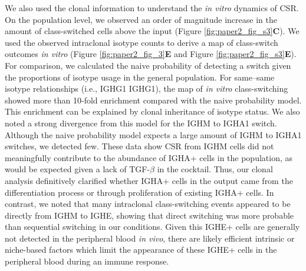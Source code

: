 We also used the clonal information to understand the \textit{in vitro} dynamics of CSR. On the population level, we observed an order of magnitude increase in the amount of class-switched cells above the input (Figure \ref{fig:paper2_fig_s3}\textbf{C}). We used the observed intraclonal isotype counts to derive a map of class-switch outcomes \textit{in vitro} (Figure \ref{fig:paper2_fig_3}\textbf{E} and Figure \ref{fig:paper2_fig_s3}\textbf{E}). For comparison, we calculated the naive probability of detecting a switch given the proportions of isotype usage in the general population. For same–same isotype relationships (i.e., IGHG1 IGHG1), the map of \textit{in vitro} class-switching showed more than 10-fold enrichment compared with the naive probability model. This enrichment can be explained by clonal inheritance of isotype status. We also noted a strong divergence from this model for the IGHM to IGHA1 switch. Although the naive probability model expects a large amount of IGHM to IGHA1 switches, we detected few. These data show CSR from IGHM cells did not meaningfully contribute to the abundance of IGHA+ cells in the population, as would be expected given a lack of TGF-$\beta$ in the cocktail\cite{stavnezer_surprising_2009}. Thus, our clonal analysis definitively clarified whether IGHA+ cells in the output came from the differentiation process or through proliferation of existing IGHA+ cells. In contrast, we noted that many intraclonal class-switching events appeared to be directly from IGHM to IGHE, showing that direct switching was more probable than sequential switching in our conditions. Given this IGHE+ cells are generally not detected in the peripheral blood \textit{in vivo}, there are likely efficient intrinsic or niche-based factors which limit the appearance of these IGHE+ cells in the peripheral blood during an immune response.

